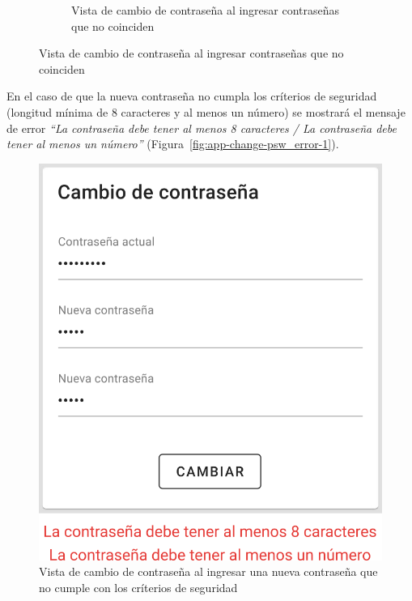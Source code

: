 \begin{itemize}
\begin{figure}[H]
\begin{subfigure}[b]{0.45\textwidth}
        \caption{Vista de cambio de contraseña al ingresar contraseñas que no coinciden}
        \label{fig:app-change-psw_error-2}
    \end{subfigure}
    \label{fig:app-change-psw-2}
\end{figure}

En el caso de que la nueva contraseña no cumpla los críterios de seguridad (longitud mínima de 8 caracteres y al menos un número) se mostrará el mensaje de error  \textit{“La contraseña debe tener al menos 8 caracteres / La contraseña debe tener al menos un número”} (Figura~\ref{fig:app-change-psw_error-1}).
\begin{figure}[H]
    \includegraphics[width=0.45\linewidth]{images/app/change-psw-error3.png}
    \captionsetup{justification=raggedright, width=0.45\linewidth, singlelinecheck=off}

    \caption{Vista de cambio de contraseña al ingresar una nueva contraseña que no cumple con los críterios de seguridad}
    \label{fig:app-change-psw_error-3}
\end{figure}




\end{itemize}
